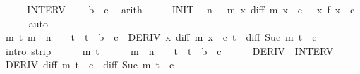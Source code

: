 \begin{isabellebody}
%
\isadelimproof
%
\endisadelimproof
%
\isatagproof
{}\isamarkupfalse%
\ {\isacharminus}{\kern0pt}\isanewline
\ \ \isamarkupfalse%
\ INTERV\ \isamarkupfalse%
\ {\isachardoublequoteopen}{}\ {\isacharless}{\kern0pt}\ b\ {\isacharminus}{\kern0pt}\ c{\isachardoublequoteclose}\ \isamarkupfalse%
\ arith\isanewline
\ \ \isamarkupfalse%
\ \isamarkupfalse%
\ INIT\ \isamarkupfalse%
\ {\isachardoublequoteopen}n\ {\isachargreater}{\kern0pt}\ {}{\isachardoublequoteclose}\ {\isachardoublequoteopen}{\isacharparenleft}{\kern0pt}{\isasymlambda}m\ x{\isachardot}{\kern0pt}\ diff\ m\ {\isacharparenleft}{\kern0pt}x\ {\isacharplus}{\kern0pt}\ c{\isacharparenright}{\kern0pt}{\isacharparenright}{\kern0pt}\ {}\ {\isacharequal}{\kern0pt}\ {\isacharparenleft}{\kern0pt}{\isasymlambda}x{\isachardot}{\kern0pt}\ f\ {\isacharparenleft}{\kern0pt}x\ {\isacharplus}{\kern0pt}\ c{\isacharparenright}{\kern0pt}{\isacharparenright}{\kern0pt}{\isachardoublequoteclose}\isanewline
\ \ \ \ \isamarkupfalse%
\ auto\isanewline
\ \ \isamarkupfalse%
\isanewline
\ \ \isamarkupfalse%
\ {\isachardoublequoteopen}{\isasymforall}m\ t{\isachardot}{\kern0pt}\ m\ {\isacharless}{\kern0pt}\ n\ {\isasymand}\ {}\ {\isasymle}\ t\ {\isasymand}\ t\ {\isasymle}\ b\ {\isacharminus}{\kern0pt}\ c\ {\isasymlongrightarrow}\ DERIV\ {\isacharparenleft}{\kern0pt}{\isasymlambda}x{\isachardot}{\kern0pt}\ diff\ m\ {\isacharparenleft}{\kern0pt}x\ {\isacharplus}{\kern0pt}\ c{\isacharparenright}{\kern0pt}{\isacharparenright}{\kern0pt}\ t\ {\isacharcolon}{\kern0pt}{\isachargreater}{\kern0pt}\ diff\ {\isacharparenleft}{\kern0pt}Suc\ m{\isacharparenright}{\kern0pt}\ {\isacharparenleft}{\kern0pt}t\ {\isacharplus}{\kern0pt}\ c{\isacharparenright}{\kern0pt}{\isachardoublequoteclose}\isanewline
\ \ \isamarkupfalse%
\ {\isacharparenleft}{\kern0pt}intro\ strip{\isacharparenright}{\kern0pt}\isanewline
\ \ \ \ \isamarkupfalse%
\ m\ t\isanewline
\ \ \ \ \isamarkupfalse%
\ {\isachardoublequoteopen}m\ {\isacharless}{\kern0pt}\ n\ {\isasymand}\ {}\ {\isasymle}\ t\ {\isasymand}\ t\ {\isasymle}\ b\ {\isacharminus}{\kern0pt}\ c{\isachardoublequoteclose}\isanewline
\ \ \ \ \isamarkupfalse%
\ DERIV\ \ INTERV\ \isamarkupfalse%
\ {\isachardoublequoteopen}DERIV\ {\isacharparenleft}{\kern0pt}diff\ m{\isacharparenright}{\kern0pt}\ {\isacharparenleft}{\kern0pt}t\ {\isacharplus}{\kern0pt}\ c{\isacharparenright}{\kern0pt}\ {\isacharcolon}{\kern0pt}{\isachargreater}{\kern0pt}\ diff\ {\isacharparenleft}{\kern0pt}Suc\ m{\isacharparenright}{\kern0pt}\ {\isacharparenleft}{\kern0pt}t\ {\isacharplus}{\kern0pt}\ c{\isacharparenright}{\kern0pt}{\isachardoublequoteclose}\isanewline

\end{isabellebody}
